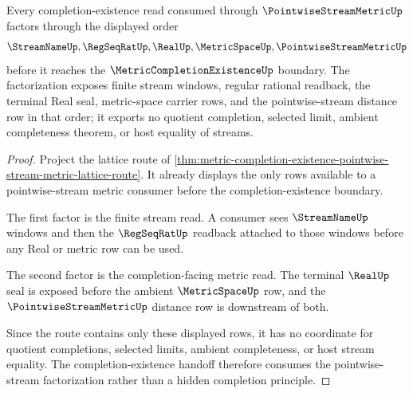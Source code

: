 \begin{theorem}
\label{thm:metric-completion-existence-pointwise-stream-factorization}
Every completion-existence read consumed through $\PointwiseStreamMetricUp$ factors through the displayed order
$$
\StreamNameUp,\RegSeqRatUp,\RealUp,\MetricSpaceUp,\PointwiseStreamMetricUp
$$
before it reaches the $\MetricCompletionExistenceUp$ boundary. The factorization exposes finite stream windows, regular rational readback, the terminal Real seal, metric-space carrier rows, and the pointwise-stream distance row in that order; it exports no quotient completion, selected limit, ambient completeness theorem, or host equality of streams.
\end{theorem}
\begin{proof}
Project the lattice route of \autoref{thm:metric-completion-existence-pointwise-stream-metric-lattice-route}. It already displays the only rows available to a pointwise-stream metric consumer before the completion-existence boundary.

The first factor is the finite stream read. A consumer sees $\StreamNameUp$ windows and then the $\RegSeqRatUp$ readback attached to those windows before any Real or metric row can be used.

The second factor is the completion-facing metric read. The terminal $\RealUp$ seal is exposed before the ambient $\MetricSpaceUp$ row, and the $\PointwiseStreamMetricUp$ distance row is downstream of both.

Since the route contains only these displayed rows, it has no coordinate for quotient completions, selected limits, ambient completeness, or host stream equality. The completion-existence handoff therefore consumes the pointwise-stream factorization rather than a hidden completion principle.
\end{proof}
